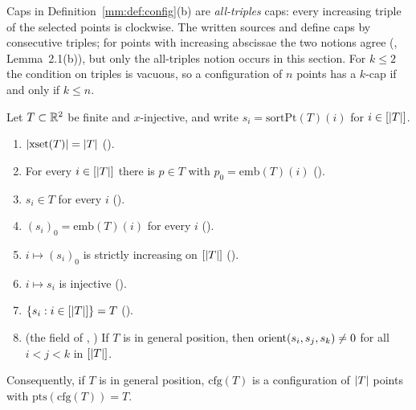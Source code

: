 \begin{remark}
Caps in Definition~\ref{mm:def:config}(b) are \emph{all-triples} caps: every increasing triple of the
selected points is clockwise. The written sources  and
 define caps by consecutive triples; for points with increasing abscissae the
two notions agree (, Lemma~2.1(b)), but only the all-triples notion occurs in
this section. For $k\le2$ the condition on triples is vacuous, so a configuration of $n$ points has a
$k$-cap if and only if $k\le n$.
\end{remark}

\begin{lemma}\label{mm:lem:sort}
Let $T\subset\mathbb R^2$ be finite and $x$-injective, and write $s_i=\mathrm{sortPt}(T)(i)$ for
$i\in[\lvert T\rvert]$.
\begin{enumerate}[label=(\alph*)]
\item $\lvert\mathrm{xset}(T)\rvert=\lvert T\rvert$ ().
\item For every $i\in[\lvert T\rvert]$ there is $p\in T$ with $p_0=\mathrm{emb}(T)(i)$ ().
\item $s_i\in T$ for every $i$ ().
\item $(s_i)_0=\mathrm{emb}(T)(i)$ for every $i$ ().
\item $i\mapsto(s_i)_0$ is strictly increasing on $[\lvert T\rvert]$ ().
\item $i\mapsto s_i$ is injective ().
\item $\{s_i:i\in[\lvert T\rvert]\}=T$ ().
\item (the field  of , )
  If $T$ is in general position, then $\operatorname{orient}(s_i,s_j,s_k)\ne0$ for all $i<j<k$ in $[\lvert T\rvert]$.
\end{enumerate}
Consequently, if $T$ is in general position, $\mathrm{cfg}(T)$ is a configuration of $\lvert T\rvert$ points with
$\mathrm{pts}(\mathrm{cfg}(T))=T$.
\end{lemma}

